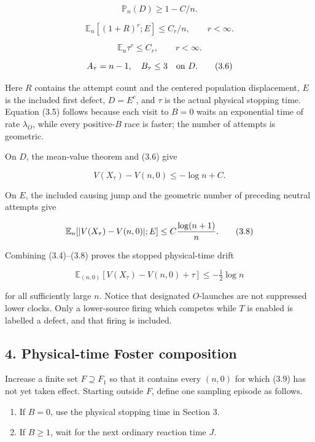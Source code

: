 \[
 \mathbb P_n(D)\ge1-C/n.
\]

\[
 \mathbb E_n[(1+R)^r;E]\le C_r/n,\qquad r<\infty.              \tag{3.4}
\]

\[
 \mathbb E_n\tau^r\le C_r,\qquad r<\infty.                    \tag{3.5}
\]

\[
 A_\tau=n-1,\quad B_\tau\le3\quad\hbox{on }D.               \tag{3.6}
\]

Here \(R\) contains the attempt count and the centered population
displacement, \(E\) is the included first defect, \(D=E^c\), and
\(\tau\) is the actual physical stopping time. Equation (3.5) follows
because each visit to \(B=0\) waits an exponential time of rate
\(\lambda_O\), while every positive-\(B\) race is faster; the number of
attempts is geometric.

On \(D\), the mean-value theorem and (3.6) give

\[
 V(X_\tau)-V(n,0)\le-\log n+C.                                \tag{3.7}
\]

On \(E\), the included causing jump and the geometric number of
preceding neutral attempts give

\[
 \mathbb E_n[|V(X_\tau)-V(n,0)|;E]\le C{\log(n+1)\over n}.      \tag{3.8}
\]

Combining (3.4)--(3.8) proves the stopped physical-time drift

\[
 \mathbb E_{(n,0)}[V(X_\tau)-V(n,0)+\tau]
 \le-\tfrac12\log n                                           \tag{3.9}
\]

for all sufficiently large \(n\). Notice that designated \(O\)-launches
are not suppressed lower clocks. Only a lower-source firing which
competes while \(T\) is enabled is labelled a defect, and that firing is
included.

\subsection{4. Physical-time Foster
composition}

Increase a finite set \(F\supseteq F_1\) so that it contains every
\((n,0)\) for which (3.9) has not yet taken effect. Starting outside
\(F\), define one sampling episode as follows.

\begin{enumerate}
\def\labelenumi{\arabic{enumi}.}
\tightlist
\item
  If \(B=0\), use the physical stopping time in Section 3.
\item
  If \(B\ge1\), wait for the next ordinary reaction time \(J\).
\end{enumerate}

